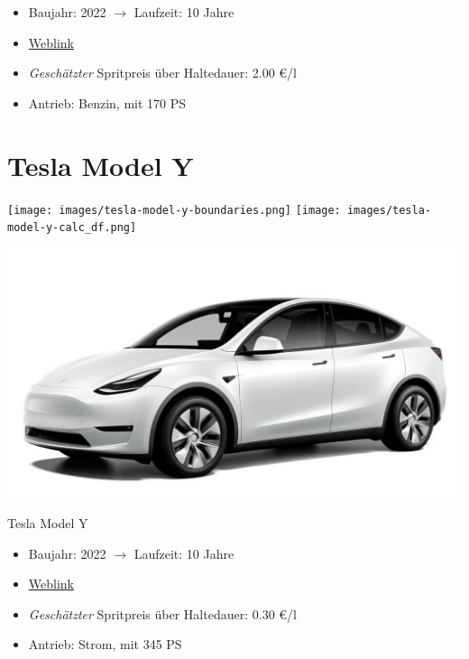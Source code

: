 \documentclass[landscape, DIV=99, 14pt]{scrartcl}
\begin{document}
\begin{itemize}
    \item Baujahr: 2022 $\rightarrow$ Laufzeit: 10 Jahre
    \item \href{https://konfigurator.meinauto.de/mercedes/neuwagen/c-klasse/angebote/c-klasse-t-modell/konfigurator/\#!/preisvergleich/-/8866563/2,47,74,81/private/43735-7309-290394/349/61d36ce4c3067/cash-purchase/73169--190162/48,0,10000,0,0,0,0,0,}{Weblink}
    \item \emph{Gesch\"atzter} Spritpreis \"uber Haltedauer: 2.00 \euro{}/l
    \item Antrieb: Benzin, mit 170 PS
\end{itemize}

\pagebreak


\twocolumn

\section*{Tesla Model Y}
\begin{center}
\texttt{[image: images/tesla-model-y-boundaries.png]}
\null
\vspace{0.5cm}
\texttt{[image: images/tesla-model-y-calc\_df.png]}
\end{center}

\pagebreak
\null
\vspace{2cm}
\begin{center}
\includegraphics[width=0.9\columnwidth]{cars/tesla-model-y.jpg}

Tesla Model Y
\end{center}

\begin{itemize}
    \item Baujahr: 2022 $\rightarrow$ Laufzeit: 10 Jahre
    \item \href{https://www.tesla.com/de_de/modely/design\#overview}{Weblink}
    \item \emph{Gesch\"atzter} Spritpreis \"uber Haltedauer: 0.30 \euro{}/l
    \item Antrieb: Strom, mit 345 PS
\end{itemize}
\end{document}
